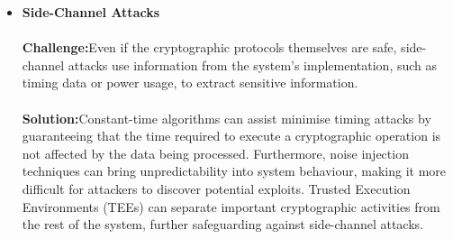 \documentclass[12pt]{article}
\begin{document}
\begin{itemize}
	\item \textbf{Side-Channel Attacks}\\\\
	\textbf{Challenge:}Even if the cryptographic protocols themselves are safe, side-channel attacks use information from the system's implementation, such as timing data or power usage, to extract sensitive information.\\\\
	\textbf{Solution:}Constant-time algorithms can assist minimise timing attacks by guaranteeing that the time required to execute a cryptographic operation is not affected by the data being processed. Furthermore, noise injection techniques can bring unpredictability into system behaviour, making it more difficult for attackers to discover potential exploits. Trusted Execution Environments (TEEs) can separate important cryptographic activities from the rest of the system, further safeguarding against side-channel attacks.~\cite{Percival2005}\\\\
	

\end{itemize}
\end{document}
